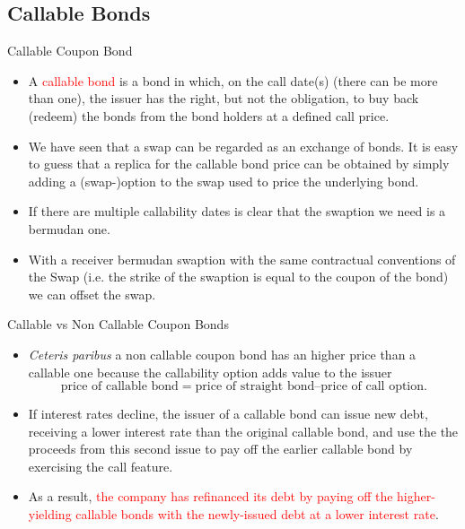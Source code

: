 \documentclass{beamer}
\begin{document}
\subsection{Callable Bonds}
\begin{frame}{Callable Coupon Bond}
\begin{itemize}
	\item A \textcolor{red}{callable bond} is a bond in which, on the call date(s) (there can be more than one), the issuer has the right, but not the obligation, to buy back (redeem) the bonds from the bond holders at a defined call price.
	\item We have seen that a swap can be regarded as an exchange of bonds. It is easy to guess that a replica for the callable bond price can be obtained by simply adding a (swap-)option to the swap used to price the underlying bond.
	\item If there are multiple callability dates is clear that the swaption we need is a bermudan one.
	\item With a receiver bermudan swaption with the same contractual conventions of the Swap (i.e. the strike of the swaption is equal to the coupon of the bond) we can offset the swap. %
\end{itemize}
\end{frame}

\begin{frame}{Callable vs Non Callable Coupon Bonds}
\begin{itemize}
	\item \emph{Ceteris paribus} a non callable coupon bond has an higher price than a callable one because the callability option adds value to the issuer
	\begin{equation*}
		\text{price of callable bond} = \text{price of straight bond} – \text{price of call option}.
	\end{equation*}
	\item If interest rates decline, the issuer of a callable bond can issue new debt, receiving a lower interest rate than the original callable bond, and use the the proceeds from this second issue to pay off the earlier callable bond by exercising the call feature.
	\item As a result, \textcolor{red}{the company has refinanced its debt by paying off the higher-yielding callable bonds with the newly-issued debt at a lower interest rate}.		
\end{itemize}
\end{frame}
\end{document}
